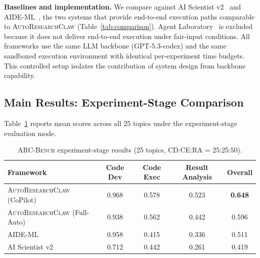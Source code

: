 \documentclass{llmxive}
\providecommand{\system}{\textsc{AutoResearchClaw}}
\providecommand{\bench}{\textsc{ARC-Bench}}
\begin{document}
\noindent \textbf{Baselines and implementation.} We compare against AI Scientist v2~\citep{yamada2025aiscientistv2} and AIDE-ML~\citep{aide2025}, the two systems that provide end-to-end execution paths comparable to \system{} (Table~\ref{tab:comparison}). Agent Laboratory~\citep{schmidgall2025agentlab} is excluded because it does not deliver end-to-end execution under fair-input conditions. All frameworks use the same LLM backbone (GPT-5.3-codex) and the same sandboxed execution environment with identical per-experiment time budgets. This controlled setup isolates the contribution of system design from backbone capability.

\vspace{-0.3em}
\subsection{Main Results: Experiment-Stage Comparison}
\label{sec:arcbench}
\vspace{-0.3em}

Table~\ref{tab:arcbench-aggregate} reports mean scores across all 25 topics under the experiment-stage evaluation mode.


\begin{table}[t]
\centering
\small
\begin{tabular*}{\textwidth}{@{\extracolsep{\fill}}lcccc@{}}
\toprule
\textbf{Framework} & \textbf{Code Dev} & \textbf{Code Exec}
  & \textbf{Result Analysis} & \textbf{Overall} \\
\midrule
\system{} (CoPilot)   & 0.968 & 0.578 & 0.523 & \textbf{0.648} \\
\system{} (Full-Auto) & 0.938 & 0.562 & 0.442 & 0.596 \\
AIDE-ML               & 0.958 & 0.415 & 0.336 & 0.511 \\
AI Scientist v2       & 0.712 & 0.442 & 0.261 & 0.419 \\
\bottomrule
\end{tabular*}
\caption{\bench{} experiment-stage results (25 topics, CD:CE:RA = 25:25:50).}
\label{tab:arcbench-aggregate}
\end{table}
\end{document}
